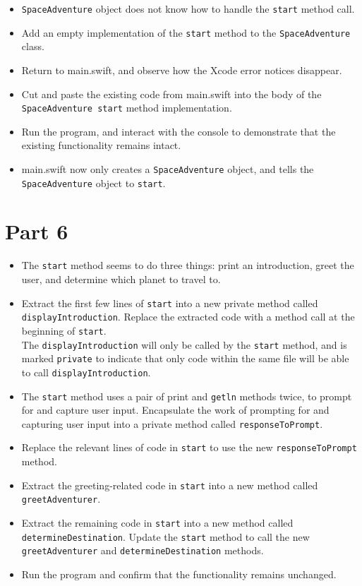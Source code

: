 \documentclass[a4paper,11pt]{scrartcl}
\begin{document}
\begin{itemize}
\item \texttt{SpaceAdventure} object does not know how to handle the \texttt{start} method call.
\item Add an empty implementation of the \texttt{start} method to the \texttt{SpaceAdventure} class.
\item Return to main.swift, and observe how the Xcode error notices disappear.
\item Cut and paste the existing code from main.swift into the body of the \texttt{SpaceAdventure start} method implementation.
\item Run the program, and interact with the console to demonstrate that the existing functionality remains intact.
\item main.swift now only creates a \texttt{SpaceAdventure} object, and tells the \texttt{SpaceAdventure} object to \texttt{start}.
\end{itemize}

\section*{Part 6}

\begin{itemize}
\item The \texttt{start} method seems to do three things: print an introduction, greet the user, and determine which planet to travel to.
\item Extract the first few lines of \texttt{start} into a new private method called \texttt{displayIntroduction}. Replace the extracted code with a method call at the beginning of \texttt{start}.\\
The \texttt{displayIntroduction} will only be called by the \texttt{start} method, and is marked \texttt{private} to indicate that only code within the same file will be able to call \texttt{displayIntroduction}.
\item The \texttt{start} method uses a pair of print and \texttt{getln} methods twice, to prompt for and capture user input. Encapsulate the work of prompting for and capturing user input into a private method called \texttt{responseToPrompt}.
\item Replace the relevant lines of code in \texttt{start} to use the new \texttt{responseToPrompt} method.
\item Extract the greeting-related code in \texttt{start} into a new method called \texttt{greetAdventurer}.
\item Extract the remaining code in \texttt{start} into a new method called \texttt{determineDestination}. Update the \texttt{start} method to call the new \texttt{greetAdventurer} and \texttt{determineDestination} methods.
\item Run the program and confirm that the functionality remains unchanged.
\end{itemize}
\end{document}
